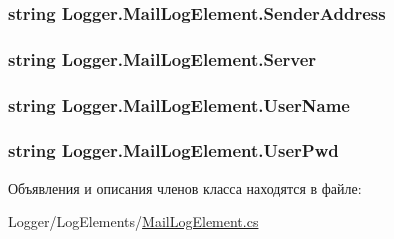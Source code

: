 \subsubsection[{Sender\+Address}]{\setlength{\rightskip}{0pt plus 5cm}string Logger.\+Mail\+Log\+Element.\+Sender\+Address\hspace{0.3cm}{\ttfamily [get]}}\label{class_logger_1_1_mail_log_element_ad31367eb4d1cbbf2dc72cd6ea9931b96}
\hypertarget{class_logger_1_1_mail_log_element_a905858500657e80ffed3da8027ff61b0}{}
\subsubsection[{Server}]{\setlength{\rightskip}{0pt plus 5cm}string Logger.\+Mail\+Log\+Element.\+Server\hspace{0.3cm}{\ttfamily [get]}}\label{class_logger_1_1_mail_log_element_a905858500657e80ffed3da8027ff61b0}
\hypertarget{class_logger_1_1_mail_log_element_a1c27d48ed2179c762fcfa529c09ca2c4}{}
\subsubsection[{User\+Name}]{\setlength{\rightskip}{0pt plus 5cm}string Logger.\+Mail\+Log\+Element.\+User\+Name\hspace{0.3cm}{\ttfamily [get]}}\label{class_logger_1_1_mail_log_element_a1c27d48ed2179c762fcfa529c09ca2c4}
\hypertarget{class_logger_1_1_mail_log_element_a43af5a71bdf3356961fba873d781a401}{}
\subsubsection[{User\+Pwd}]{\setlength{\rightskip}{0pt plus 5cm}string Logger.\+Mail\+Log\+Element.\+User\+Pwd\hspace{0.3cm}{\ttfamily [get]}}\label{class_logger_1_1_mail_log_element_a43af5a71bdf3356961fba873d781a401}


Объявления и описания членов класса находятся в файле\+:\begin{DoxyCompactItemize}
\item 
Logger/\+Log\+Elements/\hyperlink{_mail_log_element_8cs}{Mail\+Log\+Element.\+cs}\end{DoxyCompactItemize}
